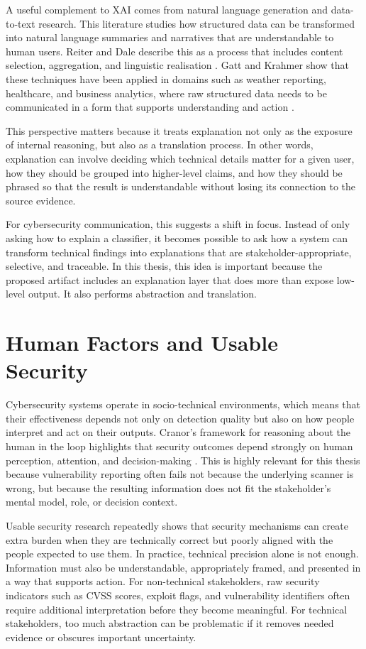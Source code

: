 A useful complement to XAI comes from natural language generation and data-to-text research. This literature studies how structured data can be transformed into natural language summaries and narratives that are understandable to human users. Reiter and Dale describe this as a process that includes content selection, aggregation, and linguistic realisation \cite{reiter2000nlg}. Gatt and Krahmer show that these techniques have been applied in domains such as weather reporting, healthcare, and business analytics, where raw structured data needs to be communicated in a form that supports understanding and action \cite{gatt2018survey}.

This perspective matters because it treats explanation not only as the exposure of internal reasoning, but also as a translation process. In other words, explanation can involve deciding which technical details matter for a given user, how they should be grouped into higher-level claims, and how they should be phrased so that the result is understandable without losing its connection to the source evidence.

For cybersecurity communication, this suggests a shift in focus. Instead of only asking how to explain a classifier, it becomes possible to ask how a system can transform technical findings into explanations that are stakeholder-appropriate, selective, and traceable. In this thesis, this idea is important because the proposed artifact includes an explanation layer that does more than expose low-level output. It also performs abstraction and translation.

\section{Human Factors and Usable Security}

Cybersecurity systems operate in socio-technical environments, which means that their effectiveness depends not only on detection quality but also on how people interpret and act on their outputs. Cranor’s framework for reasoning about the human in the loop highlights that security outcomes depend strongly on human perception, attention, and decision-making \cite{cranor2008framework}. This is highly relevant for this thesis because vulnerability reporting often fails not because the underlying scanner is wrong, but because the resulting information does not fit the stakeholder’s mental model, role, or decision context.

Usable security research repeatedly shows that security mechanisms can create extra burden when they are technically correct but poorly aligned with the people expected to use them. In practice, technical precision alone is not enough. Information must also be understandable, appropriately framed, and presented in a way that supports action. For non-technical stakeholders, raw security indicators such as CVSS scores, exploit flags, and vulnerability identifiers often require additional interpretation before they become meaningful. For technical stakeholders, too much abstraction can be problematic if it removes needed evidence or obscures important uncertainty.

